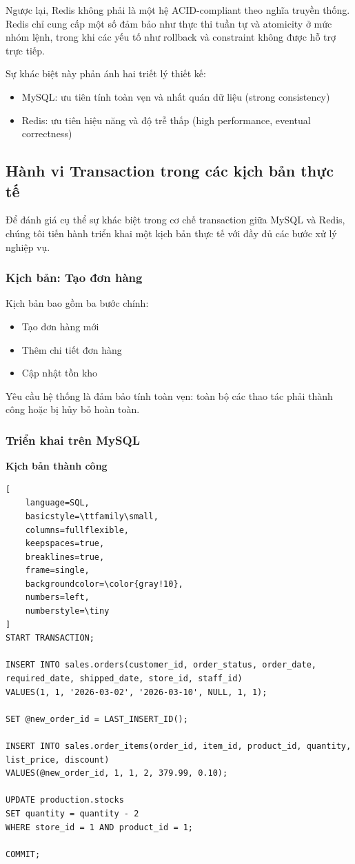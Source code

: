Ngược lại, Redis không phải là một hệ ACID-compliant theo nghĩa truyền thống. Redis chỉ cung cấp một số đảm bảo như thực thi tuần tự và atomicity ở mức nhóm lệnh, trong khi các yếu tố như rollback và constraint không được hỗ trợ trực tiếp.

Sự khác biệt này phản ánh hai triết lý thiết kế:
\begin{itemize}
\item MySQL: ưu tiên tính toàn vẹn và nhất quán dữ liệu (strong consistency)
\item Redis: ưu tiên hiệu năng và độ trễ thấp (high performance, eventual correctness)
\end{itemize}


\subsection{Hành vi Transaction trong các kịch bản thực tế}
Để đánh giá cụ thể sự khác biệt trong cơ chế transaction giữa MySQL và Redis, chúng tôi tiến hành triển khai một kịch bản thực tế với đầy đủ các bước xử lý nghiệp vụ.

\subsubsection{Kịch bản: Tạo đơn hàng}

Kịch bản bao gồm ba bước chính:
\begin{itemize}
\item Tạo đơn hàng mới
\item Thêm chi tiết đơn hàng
\item Cập nhật tồn kho
\end{itemize}

Yêu cầu hệ thống là đảm bảo tính toàn vẹn: toàn bộ các thao tác phải thành công hoặc bị hủy bỏ hoàn toàn.

\subsubsection{Triển khai trên MySQL}
\textbf{Kịch bản thành công}
\begin{lstlisting}[
    language=SQL,
    basicstyle=\ttfamily\small,
    columns=fullflexible,
    keepspaces=true,
    breaklines=true,
    frame=single,
    backgroundcolor=\color{gray!10},
    numbers=left,
    numberstyle=\tiny
]
START TRANSACTION;

INSERT INTO sales.orders(customer_id, order_status, order_date, required_date, shipped_date, store_id, staff_id)
VALUES(1, 1, '2026-03-02', '2026-03-10', NULL, 1, 1);

SET @new_order_id = LAST_INSERT_ID();

INSERT INTO sales.order_items(order_id, item_id, product_id, quantity, list_price, discount)
VALUES(@new_order_id, 1, 1, 2, 379.99, 0.10);

UPDATE production.stocks 
SET quantity = quantity - 2
WHERE store_id = 1 AND product_id = 1;

COMMIT;
\end{lstlisting}

